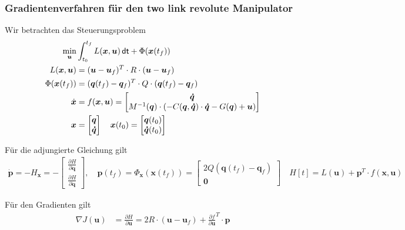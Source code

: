 \documentclass[a4paper, 12pt]{scrartcl}
\newcommand{\dt}{\thinspace \mathsf{dt}}
\begin{document}
\subsubsection{Gradientenverfahren für den two link revolute Manipulator}

Wir betrachten das Steuerungsproblem 
%
\begin{align*}
    \min_{\bm{u}} &\int_{t_0}^{t_f} L(\bm{x},\bm{u}) \dt + \Phi(\bm{x}(t_f)) \\
    L(\bm{x},\bm{u}) 
    &= 
    (\bm{u} - \bm{u}_f)^T \cdot R \cdot (\bm{u} - \bm{u}_f) \\ 
    \Phi(\bm{x}(t_f)) &= (\bm{q}(t_f) - \bm{q}_f)^T \cdot Q \cdot (\bm{q}(t_f) - \bm{q}_f) \\
    \dot{\bm{x}} &= f(\bm{x},\bm{u}) =  
    \begin{bmatrix}
        \bm{\dot{q}} \\
        M^{-1}(\bm{q}) \cdot ( - C(\bm{q},\bm{\dot{q}}) \cdot \bm{\dot{q}} - G(\bm{q}) + \bm{u} )
    \end{bmatrix}
    \\
    \bm{x} 
    &=
    \begin{bmatrix}
        \bm{q} \\
        \bm{\dot{q}}
    \end{bmatrix}
    \quad
    \bm{x}(t_0) =
    \begin{bmatrix}
        \bm{q}(t_0) \\
        \bm{\dot{q}}(t_0)
    \end{bmatrix}
\end{align*}

Für die adjungierte Gleichung gilt
%
\begin{align*}
    \dot{\bm{p}} = - H_{\bm{x}} 
    =
    -
    \begin{bmatrix}
        \frac{\partial H}{\partial \bm{q}} \\[6pt]
        \frac{\partial H}{\partial \bm{\dot{q}}}
    \end{bmatrix},
    \quad
    \bm{p}(t_f) = \Phi_{\bm{x}}(\bm{x}(t_f))
    = \begin{bmatrix}
        2 Q (\bm{q}(t_f) - \bm{q}_f) \\
        \bm{0}
    \end{bmatrix}
    \quad
    H[t] = L(\bm{u}) + \bm{p}^T \cdot f(\bm{x},\bm{u})
\end{align*}

Für den Gradienten gilt
%
\begin{align*}
    \nabla J(\bm{u}) 
    &= 
    \frac{\partial H}{\partial \bm{u}}
    =
    2 R \cdot (\bm{u} - \bm{u}_f) +
    \frac{\partial f}{\partial \bm{u}}^T \cdot \bm{p} 
\end{align*} 
\end{document}
